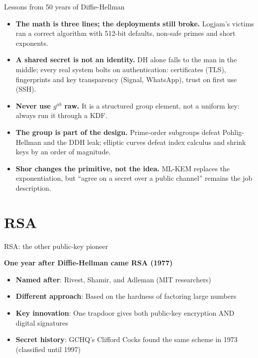 \ifdefined\PRESENTATION\else\PassOptionsToClass{handout}{beamer}\fi\documentclass[aspectratio=169, lualatex]{beamer}
\begin{document}
\begin{frame}{Lessons from 50 years of Diffie-Hellman}
	\begin{itemize}[<+->]
		\item \textbf{The math is three lines; the deployments still broke.} Logjam's victims ran a correct algorithm with 512-bit defaults, non-safe primes and short exponents.
		\item \textbf{A shared secret is not an identity.} DH alone falls to the man in the middle; every real system bolts on authentication: certificates (TLS), fingerprints and key transparency (Signal, WhatsApp), trust on first use (SSH).
		\item \textbf{Never use $g^{ab}$ raw.} It is a structured group element, not a uniform key: always run it through a KDF.
		\item \textbf{The group is part of the design.} Prime-order subgroups defeat Pohlig-Hellman and the DDH leak; elliptic curves defeat index calculus and shrink keys by an order of magnitude.
		\item \textbf{Shor changes the primitive, not the idea.} ML-KEM replaces the exponentiation, but ``agree on a secret over a public channel'' remains the job description.
	\end{itemize}
\end{frame}

\section{RSA}

\begin{frame}{RSA: the other public-key pioneer}
	\begin{center}
		\Large\textbf{One year after Diffie-Hellman came RSA (1977)}
	\end{center}
	\vspace{0.15cm}
	\begin{itemize}[<+->]
		\item \textbf{Named after}: Rivest, Shamir, and Adleman (MIT researchers)
		\item \textbf{Different approach}: Based on the hardness of factoring large numbers
		\item \textbf{Key innovation}: One trapdoor gives both public-key encryption AND digital signatures
		\item \textbf{Secret history}: GCHQ's Clifford Cocks found the same scheme in 1973 (classified until 1997)
	\end{itemize}
	\vspace{0.15cm}
\end{frame}
\end{document}
